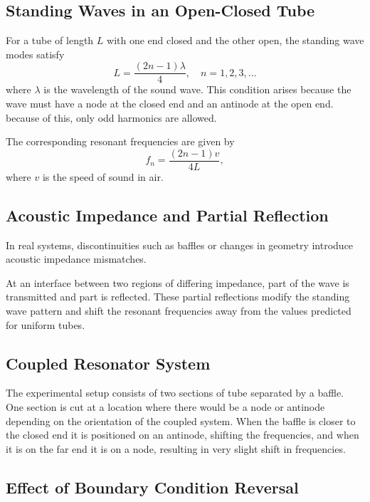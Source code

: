 \documentclass[journal, a4paper]{IEEEtran}
\begin{document}
\subsection{Standing Waves in an Open-Closed Tube}

For a tube of length $L$ with one end closed and the other open, the standing wave modes satisfy
\begin{equation}
L = \frac{(2n - 1)\lambda}{4}, \quad n = 1,2,3,\dots
\end{equation}
where $\lambda$ is the wavelength of the sound wave. This condition arises because the wave must have a node at the closed end and an antinode at the open end. because of this, only odd harmonics are allowed.

The corresponding resonant frequencies are given by
\begin{equation}
f_n = \frac{(2n - 1)v}{4L},
\end{equation}
where $v$ is the speed of sound in air.

\subsection{Acoustic Impedance and Partial Reflection}

In real systems, discontinuities such as baffles or changes in geometry introduce acoustic impedance mismatches.

At an interface between two regions of differing impedance, part of the wave is transmitted and part is reflected.
These partial reflections modify the standing wave pattern and shift the resonant frequencies away from the values predicted for uniform tubes.

\subsection{Coupled Resonator System}

The experimental setup consists of two sections of tube separated by a baffle. One section is cut at a location where there would be a node or antinode depending on the orientation of the coupled system. When the baffle is closer to the closed end it is positioned on an antinode, shifting the frequencies, and when it is on the far end it is on a node, resulting in very slight shift in frequencies.
\subsection{Effect of Boundary Condition Reversal}
\end{document}

